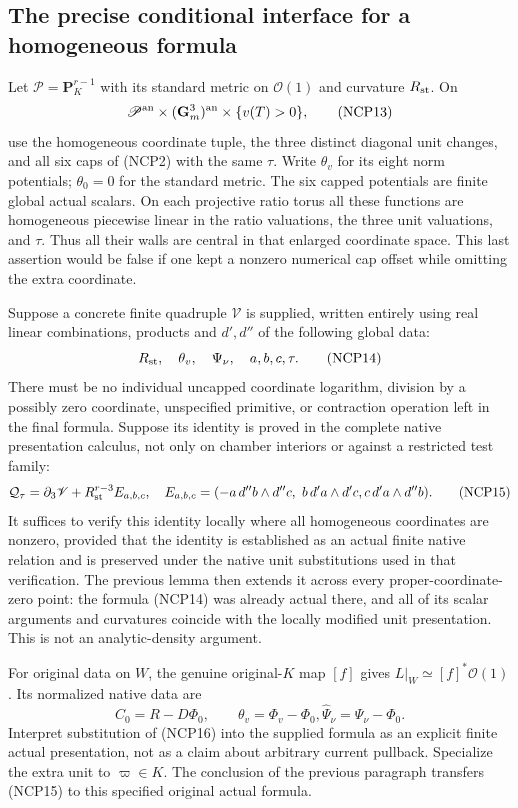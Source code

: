 \subsection{The precise conditional interface for a homogeneous formula}

Let $\mathscr P=\mathbf P^{r-1}_K$ with its standard metric on
$\mathcal O(1)$ and curvature $R_{\rm st}$.  On
\[
 \mathscr P^{\rm an}\times(\mathbf G_m^3)^{\rm an}
             \times\{v(T)>0\},
 \tag{NCP13}
\]
use the homogeneous coordinate tuple, the three distinct diagonal
unit changes, and all six caps of (NCP2) with the same $\tau$.
Write $\theta_v$ for its eight norm potentials; $\theta_0=0$
for the standard metric.  The six capped potentials are finite
global actual scalars.  On each projective ratio torus all these
functions are homogeneous piecewise linear in the ratio valuations,
the three unit valuations, and $\tau$.  Thus all their walls are
central in that enlarged coordinate space.  This last assertion
would be false if one kept a nonzero numerical cap offset while
omitting the extra coordinate.

Suppose a concrete finite quadruple $\mathscr V$ is supplied,
written entirely using real linear combinations, products and
$d',d''$ of the following global data:
\[
 R_{\rm st},\quad \theta_v,\quad
 \Psi_\nu,\quad a,b,c,\tau.
 \tag{NCP14}
\]
There must be no individual uncapped coordinate logarithm, division
by a possibly zero coordinate, unspecified primitive, or contraction
operation left in the final formula.  Suppose its identity is proved
in the complete native presentation calculus, not only on chamber
interiors or against a restricted test family:
\[
 \mathcal Q_\tau
       =\partial_3\mathscr V+R_{\rm st}^{r-3}E_{a,b,c},
 \quad
 E_{a,b,c}=
 (-a\,d''b\wedge d''c,\ b\,d'a\wedge d'c,
                                      c\,d'a\wedge d''b).
 \tag{NCP15}
\]
It suffices to verify this identity locally where all homogeneous
coordinates are nonzero, provided that the identity is established
as an actual finite native relation and is preserved under the
native unit substitutions used in that verification.  The previous
lemma then extends it across every proper-coordinate-zero point:
the formula (NCP14) was already actual there, and all of its scalar
arguments and curvatures coincide with the locally modified unit
presentation.  This is not an analytic-density argument.

For original data on $W$, the genuine original-$K$ map $[f]$ gives
$L|_W\simeq[f]^*\mathcal O(1)$.  Its normalized native data are
\[
 C_0=R-D\Phi_0,\qquad \theta_v=\Phi_v-\Phi_0,
                 \widehat\Psi_\nu=\Psi_\nu-\Phi_0.
 \tag{NCP16}
\]
Interpret substitution of (NCP16) into the supplied formula as an
explicit finite actual presentation, not as a claim about arbitrary
current pullback.  Specialize the extra unit to $\varpi\in K$.
The conclusion of the previous paragraph transfers (NCP15) to this
specified original actual formula.

